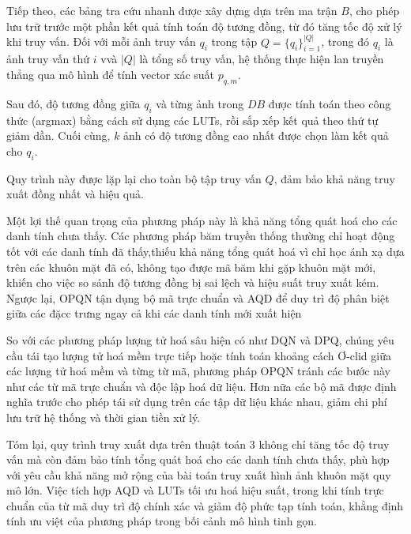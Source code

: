 Tiếp theo, các bảng tra cứu nhanh được xây dựng dựa trên ma trận $B$, cho phép lưu trữ trước một phần kết quả tính toán độ tương đồng, từ đó tăng tốc độ xử lý khi truy vấn. Đối với mỗi ảnh truy vấn $q_i$ trong tập $Q = \{q_i\}_{i=1}^{|Q|} $, trong đó $q_i$ là ảnh truy vấn thứ $i$ vvà $|Q|$ là tổng số truy vấn, hệ thống thực hiện lan truyền thẳng qua mô hình để tính vector xác suất $p_{q,m}$. 

Sau đó, độ tương đồng giữa $q_i$ và từng ảnh trong $DB$ được tính toán theo công thức (argmax) bằng cách sử dụng các LUTs, rồi sắp xếp kết quả theo thứ tự giảm dần. Cuối cùng, $k$ ảnh có độ tương đồng cao nhất được chọn làm kết quả cho $q_i$. 

Quy trình này được lặp lại cho toàn bộ tập truy vấn $Q$, đảm bảo khả năng truy xuất đồng nhất và hiệu quả.

Một lợi thế quan trọng của phương pháp này là khả năng tổng quát hoá cho các danh tính chưa thấy. Các phương pháp băm truyền thống thường chỉ hoạt động tốt với các danh tính đã thấy,thiếu khả năng tổng quát hoá vì chỉ học ánh xạ dựa trên các khuôn mặt đã có, không tạo được mã băm khi gặp khuôn mặt mới, khiến cho việc so sánh độ tương đồng bị sai lệch và hiệu suất truy xuất kém. Ngược lại, OPQN tận dụng bộ mã trực chuẩn và AQD để duy trì độ phân biệt giữa các đặcc trưng ngay cả khi các danh tính mới xuất hiện

So với các phương pháp lượng tử hoá sâu hiện có như DQN và DPQ, chúng yêu cầu tái tạo lượng tử hoá mềm trực tiếp hoặc tính toán khoảng cách Ơ-clid giữa các lượng tử hoá mềm và từng từ mã, phương pháp OPQN tránh các bước này như các từ mã trực chuẩn và độc lập hoá dữ liệu. Hơn nữa các bộ mã được định nghĩa trước cho phép tái sử dụng trên các tập dữ liệu khác nhau, giảm chi phí lưu trữ hệ thống và thời gian tiền xử lý.

Tóm lại, quy trình truy xuất dựa trên thuật toán 3 không chỉ tăng tốc độ truy vấn mà còn đảm bảo tính tổng quát hoá cho các danh tính chưa thấy, phù hợp với yêu cầu khả năng mở rộng của bài toán truy xuất hình ảnh khuôn mặt quy mô lớn. Việc tích hợp AQD và LUTs tối ưu hoá hiệu suất, trong khi tính trực chuẩn của từ mã duy trì độ chính xác và giảm độ phức tạp tính toán, khằng định tính ưu việt của phương pháp trong bối cảnh mô hình tinh gọn.

